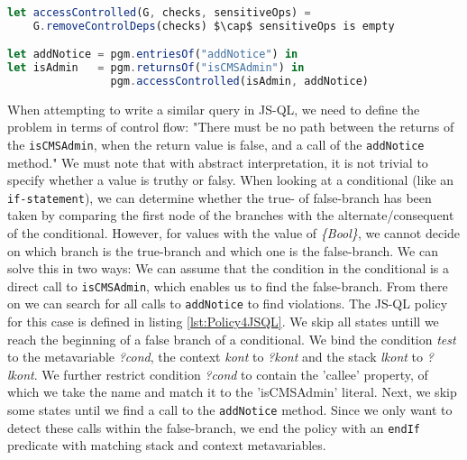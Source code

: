 \begin{lstlisting}[label={lst:Policy4PidginQL},language=JavaScript,caption=Policy 4 in PidginQL,mathescape=true]  % float=t?

let accessControlled(G, checks, sensitiveOps) = 
    G.removeControlDeps(checks) $\cap$ sensitiveOps is empty

let addNotice = pgm.entriesOf("addNotice") in
let isAdmin   = pgm.returnsOf("isCMSAdmin") in 
                pgm.accessControlled(isAdmin, addNotice)
\end{lstlisting}

When attempting to write a similar query in JS-QL, we need to define the problem in terms of control flow: "There must be no path between the returns of the \texttt{isCMSAdmin}, when the return value is false, and a call of the \texttt{addNotice} method." We must note that with abstract interpretation, it is not trivial to specify whether a value is truthy or falsy. When looking at a conditional (like an \texttt{if-statement}), we can determine whether the true- of false-branch has been taken by comparing the first node of the branches with the alternate/consequent of the conditional. However, for values with the value of \textit{\{Bool\}}, we cannot decide on which branch is the true-branch and which one is the false-branch. We can solve this in two ways: We can assume that the condition in the conditional is a direct call to \texttt{isCMSAdmin}, which enables us to find the false-branch. From there on we can search for all calls to \texttt{addNotice} to find violations. The JS-QL policy for this case is defined in listing \ref{lst:Policy4JSQL}. We skip all states untill we reach the beginning of a false branch of a conditional. We bind the condition \textit{test} to the metavariable \textit{?cond}, the context \textit{kont} to \textit{?kont} and the stack \textit{lkont} to \textit{?lkont}. We further restrict condition \textit{?cond} to contain the 'callee' property, of which we take the name and match it to the 'isCMSAdmin' literal. Next, we skip some states until we find a call to the \texttt{addNotice} method. Since we only want to detect these calls within the false-branch, we end the policy with an \texttt{endIf} predicate with matching stack and context metavariables.

